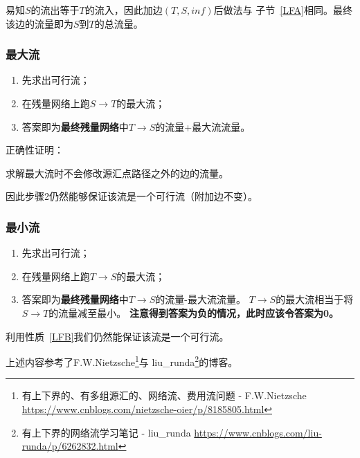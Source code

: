 易知$S$的流出等于$T$的流入，因此加边$(T,S,inf)$后做法与
子节~\ref{LFA}相同。最终该边的流量即为$S$到$T$的总流量。

\subsubsection{最大流}

\begin{enumerate}
    \item 先求出可行流；
    \item 在残量网络上跑$S\rightarrow T$的最大流；
    \item 答案即为{\bfseries 最终残量网络}中$T\rightarrow S$的流量+最大流流量。
\end{enumerate}

正确性证明：

\begin{property}\label{LFB}
    求解最大流时不会修改源汇点路径之外的边的流量。
\end{property}

因此步骤2仍然能够保证该流是一个可行流（附加边不变）。

\subsubsection{最小流}

\begin{enumerate}
    \item 先求出可行流；
    \item 在残量网络上跑$T\rightarrow S$的最大流；
    \item 答案即为{\bfseries 最终残量网络}中$T\rightarrow S$的流量-最大流流量。
    $T\rightarrow S$的最大流相当于将$S\rightarrow T$的流量减至最小。
    {\bfseries 注意得到答案为负的情况，此时应该令答案为0。}
\end{enumerate}

利用性质~\ref{LFB}我们仍然能保证该流是一个可行流。

上述内容参考了F.W.Nietzsche\footnote{有上下界的、有多组源汇的、网络流、费用流问题 - F.W.Nietzsche
\url{https://www.cnblogs.com/nietzsche-oier/p/8185805.html}}与
liu\_runda\footnote{有上下界的网络流学习笔记 - liu\_runda
\url{https://www.cnblogs.com/liu-runda/p/6262832.html}}的博客。
